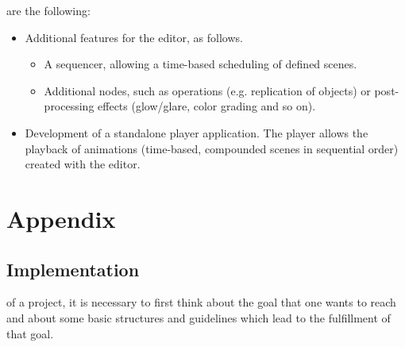 \documentclass[%
    a4paper,    %
    justified,  %
    nobib,      %
    openany     %
]{tufte-book}
\begin{document}

 are the following:
\begin{itemize}
  \item Additional features for the editor, as follows.
  \begin{itemize}
    \item A sequencer, allowing a time-based scheduling of defined scenes.
    \item Additional nodes, such as operations (e.g. replication of objects)
      or post-processing effects (glow/glare, color grading and so on).
  \end{itemize}
  \item Development of a standalone player application. The player allows the
    playback of animations (time-based, compounded scenes in sequential order)
    created with the editor.
\end{itemize}
\backmatter{}


\appendix
\part*{Appendix}
\label{part:appendix}


\chapter{Implementation}
\label{appendix:chap:implementation}

 of a project, it is necessary to
first think about the goal that one wants to reach and about some basic
structures and guidelines which lead to the fulfillment of that goal.
\end{document}
